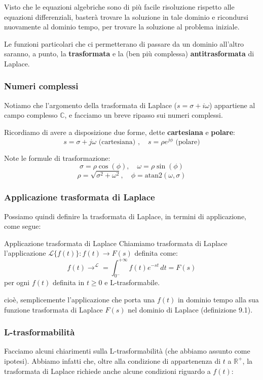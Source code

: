 \documentclass[a4paper,11pt]{article}
\begin{document}
Visto che le equazioni algebriche sono di più facile risoluzione rispetto alle equazioni differenziali, basterà trovare la soluzione in tale dominio e ricondursi nuovamente al dominio tempo, per trovare la soluzione al problema iniziale.

Le funzioni particolari che ci permetterano di passare da un dominio all'altro saranno, a punto, la \textbf{trasformata} e la (ben più complessa) \textbf{antitrasformata} di Laplace.

\subsubsection{Numeri complessi}
Notiamo che l'argomento della trasformata di Laplace ($s = \sigma + i \omega$) appartiene al campo complesso $\mathbb{C}$, e facciamo un breve ripasso sui numeri complessi.

Ricordiamo di avere a disposizione due forme, dette \textbf{cartesiana} e \textbf{polare}:
$$
s = \sigma + j \omega \text{ (cartesiana) }, \quad s = \rho e^{j \phi} \text{ (polare)} 
$$

Note le formule di trasformazione:
$$
\sigma = \rho \cos(\phi), \quad 
\omega = \rho \sin(\phi)
$$
$$
\rho = \sqrt{\sigma^2 + \omega^2}, \quad
\phi = \mathrm{atan2}(\omega, \sigma)
$$

\subsubsection{Applicazione trasformata di Laplace}
Possiamo quindi definire la trasformata di Laplace, in termini di applicazione, come segue:
\begin{definition}{Applicazione trasformata di Laplace}
	Chiamiamo trasformata di Laplace l'applicazione $\mathcal{L}\{f(t)\} : f(t) \rightarrow F(s)$ definita come:
	$$
		f(t) \rightarrow^{\mathcal{L}} = \int_{0^-}^{+\infty} f(t) e^{-st} \, dt = F(s)
	$$
	per ogni $f(t)$ definita in $t \geq 0$ e L-trasformabile.
\end{definition}
cioè, semplicemente l'applicazione che porta una $f(t)$ in dominio tempo alla sua funzione trasformata di Laplace $F(s)$ nel dominio di Laplace (definizione 9.1).

\subsubsection{L-trasformabilità}
Facciamo alcuni chiarimenti sulla L-trasformabilità (che abbiamo assunto come ipotesi).
Abbiamo infatti che, oltre alla condizione di appartenenza di $t$ a $\mathbb{R}^+$, la trasformata di Laplace richiede anche alcune condizioni riguardo a $f(t)$:
\end{document}
